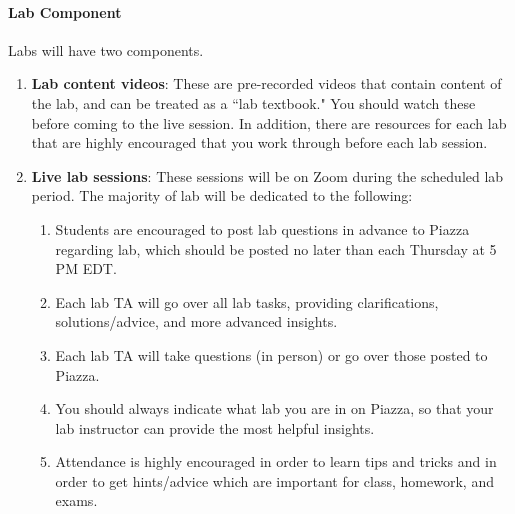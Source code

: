 \documentclass[11pt]{article}
\begin{document}
\paragraph{Lab Component}
Labs will have two components. 
\begin{enumerate}
\item \textbf{Lab content videos}: These are pre-recorded videos that contain content of the lab, and can be treated as a ``lab textbook." You should watch these before coming to the live session. In addition, there are resources for each lab that are highly encouraged that you work through before each lab session. 
\item \textbf{Live lab sessions}: These sessions will be on Zoom during the scheduled lab period. The majority of lab will be dedicated to the following:
\begin{enumerate}
\item  Students are encouraged to post lab questions in advance to Piazza regarding lab, which should be posted no later than each Thursday at 5 PM EDT. 
\item Each lab TA will go over all lab tasks, providing clarifications, solutions/advice, and more advanced insights. 
\item  Each lab TA will take questions (in person) or go over those posted to Piazza. 
\item You should always indicate what lab you are in on Piazza, so that your lab instructor can provide the most helpful insights.
\item Attendance is highly encouraged in order to learn tips and tricks and in order to get hints/advice which are important for class, homework, and exams.
\end{enumerate} 
\end{enumerate}


\end{document}
